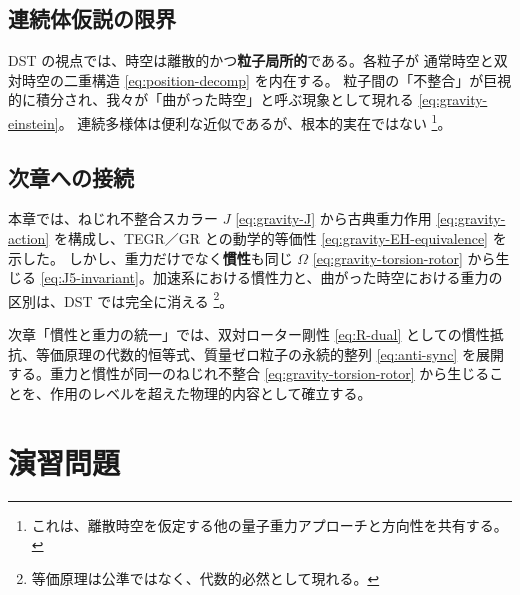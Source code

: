 \documentclass[dvipdfmx,a4paper,oneside]{jsbook}
\numberwithin{equation}{chapter}
\begin{document}
\subsection{連続体仮説の限界}

DST の視点では、時空は離散的かつ\textbf{粒子局所的}である。各粒子が 通常時空と双対時空の二重構造 \eqref{eq:position-decomp} を内在する。
粒子間の「不整合」が巨視的に積分され、我々が「曲がった時空」と呼ぶ現象として現れる \eqref{eq:gravity-einstein}。
連続多様体は便利な近似であるが、根本的実在ではない \footnote{これは、離散時空を仮定する他の量子重力アプローチと方向性を共有する。}。

\subsection{次章への接続}

本章では、ねじれ不整合スカラー \(J\) \eqref{eq:gravity-J} から古典重力作用 \eqref{eq:gravity-action} を構成し、TEGR／GR との動学的等価性 \eqref{eq:gravity-EH-equivalence} を示した。
しかし、重力だけでなく\textbf{慣性}も同じ \(\Omega\) \eqref{eq:gravity-torsion-rotor} から生じる \eqref{eq:J5-invariant}。加速系における慣性力と、曲がった時空における重力の区別は、DST では完全に消える \footnote{等価原理は公準ではなく、代数的必然として現れる。}。

次章「慣性と重力の統一」では、双対ローター剛性 \eqref{eq:R-dual} としての慣性抵抗、等価原理の代数的恒等式、質量ゼロ粒子の永続的整列 \eqref{eq:anti-sync} を展開する。重力と慣性が同一のねじれ不整合 \eqref{eq:gravity-torsion-rotor} から生じることを、作用のレベルを超えた物理的内容として確立する。

\section*{演習問題}
\end{document}
